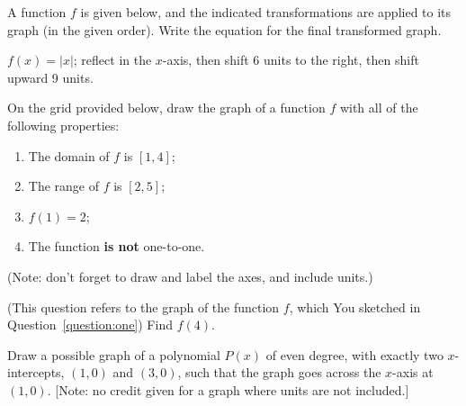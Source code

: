 \documentclass[11pt,answers]{exam}
\begin{document}
\begin{questions}
\question[1] A function $f$ is given below, and the indicated transformations are applied to its graph (in the given order). Write the equation for the final transformed graph.
\smallskip

$f(x) = |x|$;
reflect in the $x$-axis, then shift 6 units to the right, then shift upward 9 units.

\fillwithdottedlines{2cm}
		
\newpage		
\question[2] \label{question:one} On the grid provided below, draw the graph of a function $f$ with all of the following properties:
		
		\begin{minipage}[t][][b]{0.5\textwidth}
			\begin{multicols}{2}
				\begin{enumerate}
					\item The domain of $f$ is $[1,4]$;
					\item The range of $f$ is $[2,5]$;
					\item $f(1)=2$;
					\item The function {\bf{is not}} one-to-one.
				\end{enumerate}
				
		\end{multicols}
			(Note: don't forget to draw and label the axes, and include units.)
		\end{minipage}
		\begin{minipage}[t][][b]{0.5\textwidth}
			\begin{center}
			\end{center}
		\end{minipage}	
		
		\bonusquestion[1] (This question refers to the graph of the function $f$, which You sketched in Question~\ref{question:one}) Find $f(4)$.
		\fillwithdottedlines{1cm}
		
\bonusquestion[2]  Draw a possible graph of a polynomial $P(x)$ of even degree, with exactly two $x$-intercepts, $(1,0)$ and $(3,0)$, such that the graph goes across the $x$-axis at $(1,0)$. [Note: no credit given for a graph where units are not included.]

\end{questions}
\end{document}
